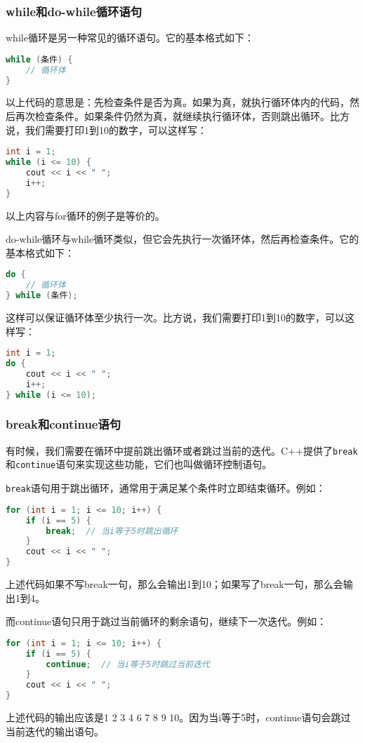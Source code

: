\documentclass[../main.tex]{subfiles}
\begin{document}
\subsubsection{while和do-while循环语句}
while循环是另一种常见的循环语句。它的基本格式如下：
\begin{lstlisting}[language=C++]
while (条件) {
    // 循环体
}
\end{lstlisting}
以上代码的意思是：先检查条件是否为真。如果为真，就执行循环体内的代码，然后再次检查条件。如果条件仍然为真，就继续执行循环体，否则跳出循环。比方说，我们需要打印1到10的数字，可以这样写：
\begin{lstlisting}[language=C++]
int i = 1;
while (i <= 10) {
    cout << i << " ";
    i++;
}
\end{lstlisting}
以上内容与for循环的例子是等价的。

do-while循环与while循环类似，但它会先执行一次循环体，然后再检查条件。它的基本格式如下：
\begin{lstlisting}[language=C++]
do {
    // 循环体
} while (条件);
\end{lstlisting}
这样可以保证循环体至少执行一次。比方说，我们需要打印1到10的数字，可以这样写：
\begin{lstlisting}[language=C++]
int i = 1;
do {
    cout << i << " ";
    i++;
} while (i <= 10);
\end{lstlisting}

\subsubsection{break和continue语句}

有时候，我们需要在循环中提前跳出循环或者跳过当前的迭代。C++提供了\texttt{break}和\texttt{continue}语句来实现这些功能，它们也叫做循环控制语句。

\texttt{break}语句用于跳出循环，通常用于满足某个条件时立即结束循环。例如：
\begin{lstlisting}[language=C++]
for (int i = 1; i <= 10; i++) {
    if (i == 5) {
        break;  // 当i等于5时跳出循环
    }
    cout << i << " ";
}
\end{lstlisting}
上述代码如果不写break一句，那么会输出1到10；如果写了break一句，那么会输出1到4。

而continue语句只用于跳过当前循环的剩余语句，继续下一次迭代。例如：
\begin{lstlisting}[language=C++]
for (int i = 1; i <= 10; i++) {
    if (i == 5) {
        continue;  // 当i等于5时跳过当前迭代
    }
    cout << i << " ";
}
\end{lstlisting}
上述代码的输出应该是1 2 3 4 6 7 8 9 10。因为当i等于5时，continue语句会跳过当前迭代的输出语句。
\end{document}
